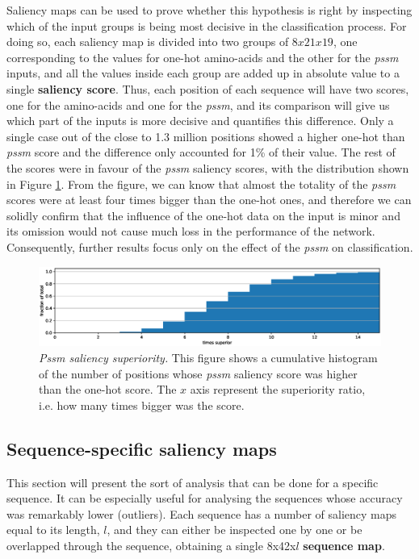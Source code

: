 Saliency maps can be used to prove whether this hypothesis is right by inspecting which of the input groups is being most decisive in the classification process. For doing so, each saliency map is divided into two groups of $8x21x19$, one corresponding to the values for one-hot amino-acids and the other for the \textit{pssm} inputs, and all the values inside each group are added up in absolute value to a single \textbf{saliency score}. Thus, each position of each sequence will have two scores, one for the amino-acids and one for the \textit{pssm}, and its comparison will give us which part of the inputs is more decisive and quantifies this difference. Only a single case out of the close to 1.3 million positions showed a higher one-hot than \textit{pssm} score and the difference only accounted for 1\% of their value. The rest of the scores were in favour of the \textit{pssm} saliency scores, with the distribution shown in Figure \ref{fig:aa_pssm}. From the figure, we can know that almost the totality of the \textit{pssm} scores were at least four times bigger than the one-hot ones, and therefore we can solidly confirm that the influence of the one-hot data on the input is minor and its omission would not cause much loss in the performance of the network. Consequently, further results focus only on the effect of the \textit{pssm} on classification.

\begin{figure}
	\centering
	\includegraphics[width=1\linewidth]{Figures/aa_pssm}
	\caption{\textit{Pssm saliency superiority.} This figure shows a cumulative histogram of the number of positions whose \textit{pssm} saliency score was higher than the one-hot score. The $x$ axis represent the superiority ratio, i.e. how many times bigger was the score.}
	\label{fig:aa_pssm}
\end{figure}



\subsection{Sequence-specific saliency maps}
This section will present the sort of analysis that can be done for a specific sequence. It can be especially useful for analysing the sequences whose accuracy was remarkably lower (outliers). Each sequence has a number of saliency maps equal to its length, $l$, and they can either be inspected one by one or be overlapped through the sequence, obtaining a single 8x42x$l$ \textbf{sequence map}.

